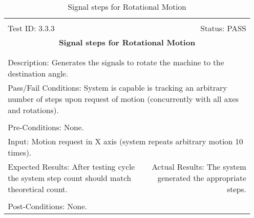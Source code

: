 \documentclass[titlepage]{article}
\begin{document}
\begin{center}
\begin{table}[h!]
\begin{tabular}{|l r|}\hline&\\[-2mm]
	Test ID: 3.3.3	&Status: PASS\\[-3mm]
	\multicolumn{2}{|c|}{\textbf{\large{Signal steps for Rotational Motion}}}\\&\\\hline&\\[-3mm]
	\multicolumn{2}{|p{\textwidth}|}{Description: Generates the signals to rotate the machine to the destination angle.}\\\hline
	\multicolumn{2}{|p{\textwidth}|}{Pass/Fail Conditions: System is capable is tracking an arbitrary number of steps upon request of motion (concurrently with all axes and rotations).}\\[1mm]\hline&\\[-3mm]
	\multicolumn{2}{|p{\textwidth}|}{Pre-Conditions: None.}\\[4mm]
	\multicolumn{2}{|p{\textwidth}|}{Input: Motion request in X axis (system repeats arbitrary motion 10 times).}\\[2mm]\hline
	\multicolumn{1}{|p{0.49\textwidth}}{Expected Results: After testing cycle the system step count should match theoretical count.}	&\multicolumn{1}{|p{0.45\textwidth}|}{Actual Results: The system generated the appropriate steps.}\\\hline&\\[-3mm]
	\multicolumn{2}{|p{\textwidth}|}{Post-Conditions: None.}\\\hline
\end{tabular}
\caption{Signal steps for Rotational Motion}
\end{table}
\end{center}
\end{document}

